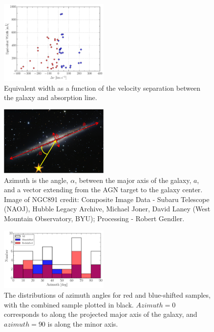 \documentclass[iop]{emulateapj-rtx4}
\begin{document}
\begin{figure}[ht!]
        \centering
        \includegraphics[width=0.48\textwidth]{W(vel_diff).pdf}
        \caption{\small{Equivalent width as a function of the velocity separation between the galaxy and absorption line.}}
        \label{W_veldif}
        \vspace{5pt}
\end{figure} 

\begin{figure}[ht!]
        \centering
        \includegraphics[width=0.48\textwidth]{azimuth_illustration2.png}
        \caption{\small{Azimuth is the angle, $\alpha$, between the major axis of the galaxy, $a$, and a vector extending from the AGN target to the galaxy center. Image of NGC891 credit: Composite Image Data - Subaru Telescope (NAOJ), Hubble Legacy Archive, Michael Joner, David Laney (West Mountain Observatory, BYU); Processing - Robert Gendler.}}
        \label{azimuth_illustration}
        \vspace{5pt}
\end{figure} 

\begin{figure}[ht!]
        \centering
        \includegraphics[width=0.48\textwidth]{hist(azimuth)_overlaid_all.pdf}
        \caption{\small{The distributions of azimuth angles for red and blue-shifted samples, with the combined sample plotted in black. $Azimuth = 0$ corresponds to along the projected major axis of the galaxy, and $azimuth = 90$ is along the minor axis.}}
        \label{azimuth_dist}
        \vspace{5pt}
\end{figure} 
\end{document}

